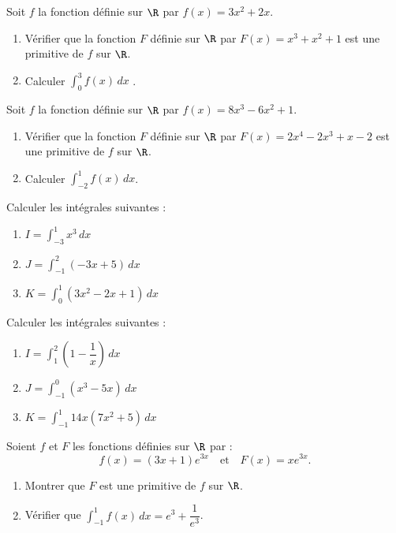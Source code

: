 \documentclass[a4paper,11pt,exos]{nsi} %
\begin{document}
\exo{}
Soit $f$ la fonction définie sur $\R$ par $f(x)=3x^2+2x$.
\begin{enumerate}
	\item Vérifier que la fonction $F$ définie sur $\R$ par $F(x)=x^3+x^2+1$ est une primitive de $f$ sur $\R$.
	\item Calculer $\displaystyle \int_{0}^{3} f(x) \, dx$ .
\end{enumerate}

\exo{}
Soit $f$ la fonction définie sur $\R$ par $f(x)=8x^3-6x^2+1$.
\begin{enumerate}
	\item Vérifier que la fonction $F$ définie sur $\R$ par $F(x)=2x^4-2x^3+x-2$ est une primitive de $f$ sur $\R$.
	\item Calculer $\displaystyle \int_{-2}^{1} f(x) \, dx$.
\end{enumerate}

\exo{}
Calculer les intégrales suivantes :
\begin{multicols}{3}
	\begin{enumerate}
		\item $I=\displaystyle \int_{-3}^{1} x^3 \, dx$
		\item $J=\displaystyle \int_{-1}^{2} (-3x+5) \, dx$
		\item $K=\displaystyle \int_{0}^{1} (3x^2-2x+1) \, dx$
	\end{enumerate}
\end{multicols}

\exo{}
Calculer les intégrales suivantes :
\begin{multicols}{3}
	\begin{enumerate}
		\item $I=\displaystyle \int_{1}^{2} \left(1-\dfrac{1}{x}\right) \, dx$
		\item $J=\displaystyle \int_{-1}^{0} (x^3-5x) \, dx$
		\item $K=\displaystyle \int_{-1}^{1} 14x(7x^2+5) \, dx$
	\end{enumerate}
\end{multicols}

\exo{}
Soient $f$ et $F$ les fonctions définies sur $\R$ par :
$$f(x)=(3x+1)e^{3x}\quad \text{et}\quad F(x)=xe^{3x}.$$
\begin{enumerate}
	\item Montrer que $F$ est une primitive de $f$ sur $\R$.
	\item Vérifier que $\displaystyle \int_{-1}^{1} f(x) \, dx = e^3+\dfrac{1}{e^3}$.
\end{enumerate}
\end{document}
